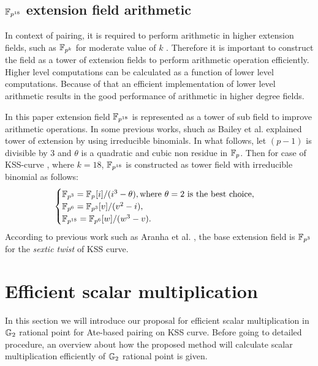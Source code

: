 \subsection{$\mathbb{F}_{p^{18}}$ extension field arithmetic}
In context of pairing, it is required to perform arithmetic in higher extension fields, such as $\mathbb{F}_{p^k}$  for moderate value of $k$ \cite{Silverman}. Therefore it is important to construct the field as a tower of extension fields \cite{EPRINT:BenSco09} to perform arithmetic operation efficiently. Higher level computations can be calculated as a function of lower level computations. Because of that an efficient implementation of lower level arithmetic results in the good performance of arithmetic in higher degree fields.

In this paper extension field  $\mathbb{F}_{p^{18}}$ is represented as a tower of sub field to improve arithmetic operations. In some previous works, shuch as Bailey et al. \cite{JC:BaiPaa01}  explained tower of extension by using irreducible binomials. In what follows, let $(p-1)$ is divisible by 3 and $\theta$ is a quadratic and cubic non residue in ${\mathbb{F}}_{p}$. Then for case of KSS-curve \cite{EPRINT:KacSchSco07}, where $k=18$, $\mathbb{F}_{p^{18}}$ is constructed as tower field with irreducible binomial as follows:
\begin{equation}\label{eq:KSS_towering}
\begin{cases}
{\mathbb{F}}_{p^{3}} = {\mathbb{F}}_{p^{}}[i]/(i^3-\theta),  \text{where $\theta = 2$ is the best choice,}\nonumber \\ 
{\mathbb{F}}_{p^{6}} = {\mathbb{F}}_{p^{3}}[v]/(v^2-i), \nonumber \\ 
{\mathbb{F}}_{p^{18}} = {\mathbb{F}}_{p^{6}}[w]/(w^3-v). \nonumber \\ 
\end{cases}
\end{equation}
According to previous work such as Aranha et al. \cite{PAIRING:AFKMR12}, the base extension field is $\mathbb{F}_{p^3}$ for the \textit{sextic twist} of KSS curve.

\section{Efficient scalar multiplication}
In this section we will introduce our proposal for efficient scalar multiplication in ${\mathbb{G}}_{2}$ rational point for Ate-based pairing on KSS curve. 
Before going to detailed procedure, an overview about how the proposed method will calculate scalar multiplication efficiently of ${\mathbb{G}}_{2}$ rational point is given.
